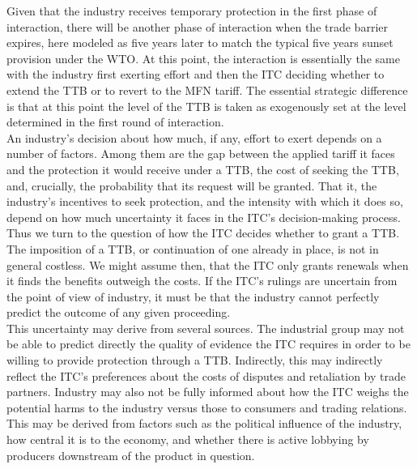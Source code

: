 \documentclass[12pt]{article}
\begin{document}
Given that the industry receives temporary protection in the first phase of interaction, there will be another phase of interaction when the trade barrier expires, here modeled as five years later to match the typical five years sunset provision under the WTO. At this point, the interaction is essentially the same with the industry first exerting effort and then the ITC deciding whether to extend the TTB or to revert to the MFN tariff. The essential strategic difference is that at this point the level of the TTB is taken as exogenously set at the level determined in the first round of interaction. \\

An industry's decision about how much, if any, effort to exert depends on a number of factors. Among them are the gap between the applied tariff it faces and the protection it would receive under a TTB, the cost of seeking the TTB, and, crucially, the probability that its request will be granted. That it, the industry's incentives to seek protection, and the intensity with which it does so, depend on how much uncertainty it faces in the ITC's decision-making process. \\
 
Thus we turn to the question of how the ITC decides whether to grant a TTB. The imposition of a TTB, or continuation of one already in place, is not in general costless. We might assume then, that the ITC only grants renewals when it finds the benefits outweigh the costs. If the ITC's rulings are uncertain from the point of view of industry, it must be that the industry cannot perfectly predict the outcome of any given proceeding. \\

This uncertainty may derive from several sources. The industrial group may not be able to predict directly the quality of evidence the ITC requires in order to be willing to provide protection through a TTB. Indirectly, this may indirectly reflect the ITC's preferences about the costs of disputes and retaliation by trade partners. Industry may also not be fully informed about how the ITC weighs the potential harms to the industry versus those to consumers and trading relations. This may be derived from factors such as the political influence of the industry, how central it is to the economy, and whether there is active lobbying by producers downstream of the product in question.
\end{document}
